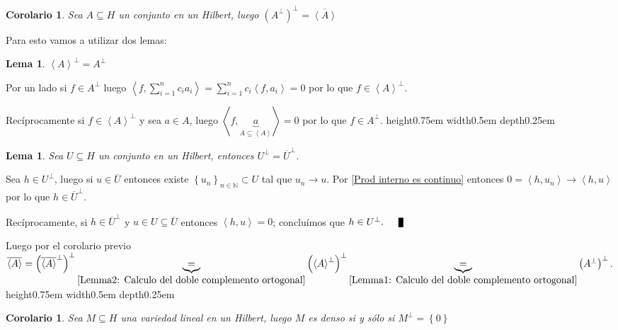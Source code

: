 \documentclass[11pt]{article}
\newcommand{\N}{{\mathbb{N}}}
\newcommand{\ip}[1]{\left\langle#1\right\rangle}
\newcommand{\sett}[1]{\left\lbrace#1\right\rbrace}
\numberwithin{theorem}{subsection}
\newtheorem{lemma}[theorem]{Lema}
\newtheorem{corollary}[theorem]{Corolario}
\newenvironment{proof}[1][Demostraci\'on]{\begin{trivlist}
		\item[\hskip \labelsep {\bfseries #1}]}{\end{trivlist}}
\newcommand{\qed}{\nobreak \ifvmode \relax \else
	\ifdim\lastskip<1.5em \hskip-\lastskip
	\hskip1.5em plus0em minus0.5em \fi \nobreak
	\vrule height0.75em width0.5em depth0.25em\fi}
\begin{document}
\begin{corollary}
	\label{Calculo del doble complemento ortogonal}
	Sea $A \subseteq H$  un conjunto en un Hilbert, luego $(A^{\perp})^{\perp} = \overline{\ip{A}}$
\end{corollary}

\begin{proof}
	Para esto vamos a utilizar dos lemas:
	
	\begin{lemma}
		\label{Lemma1: Calculo del doble complemento ortogonal}
		$\ip{A}^{\perp} = A^{\perp}$
	\end{lemma}
	
	\begin{proof}
		Por un lado si $f \in A^{\perp}$ luego $\ip{f, \sum\limits_{i=1}^{n}{c_i a_i}} = \sum\limits_{i=1}^{n}{c_i\ip{f,a_i}} = 0$ por lo que $f \in \ip{A}^{\perp}$.
		
		Rec\'iprocamente si $f \in \ip{A}^{\perp}$ y sea $a \in A$, luego $\ip{f,\underbrace{a}_{A \subseteq \ip{A}}} = 0$ por lo que $f \in A^{\perp}$. \qed
		
	\end{proof}
	
	\begin{lemma}
		\label{Lemma2: Calculo del doble complemento ortogonal}
		Sea $U \subseteq H$ un conjunto en un Hilbert, entonces $U^{\perp} = \overline{U}^{\perp}$.
	\end{lemma}
	
	\begin{proof}
		Sea $h \in U^{ \perp}$, luego si $u \in \overline{U}$ entonces existe $\sett{u_n}_{n \in \N} \subset U$ tal que $u_n \rightarrow u$. Por \ref{Prod interno es continuo} entonces $0 = \ip{h,u_n} \rightarrow \ip{h,u}$ por lo que $h \in \overline{U}^{\perp}$.
		
		Rec\'iprocamente, si $h \in \overline{U}^{\perp}$ y $u \in U \subseteq \overline{U}$ entonces $\ip{h,u} = 0$; conclu\'imos que $h \in U^{\perp}. \qed$
	\end{proof}
	
	Luego por el corolario previo $\overline{\ip{A}} = \left(\overline{\ip{A}}^{\perp}\right)^{\perp} \underbrace{=}_{\ref{Lemma2: Calculo del doble complemento ortogonal}} \left({\ip{A}}^{\perp}\right)^{\perp} \underbrace{=}_{\ref{Lemma1: Calculo del doble complemento ortogonal}} \left({{A}}^{\perp}\right)^{\perp} $. \qed
	
\end{proof}

\begin{corollary}
	\label{Variedad es densa si el complemento es vacio}
	Sea $M \subseteq H$ una variedad lineal en un Hilbert, luego $M$ es denso si y s\'olo si $M^{\perp} = \sett{0}$
\end{corollary}
\end{document}
